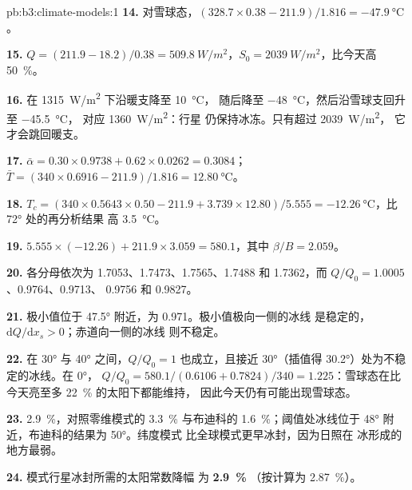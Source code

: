 \begin{solution}{pb:b3:climate-models:1}
\textbf{14.} 对雪球态，$(328.7\times0.38 - 211.9)/1.816 =
\qty{-47.9}{\celsius}$。

\textbf{15.} $Q = (211.9 - 18.2)/0.38 = \qty{509.8}{W/m^2}$，$S_0 =
\qty{2039}{W/m^2}$，比今天高 \qty{50}{\percent}。

\textbf{16.} 在 \qty{1315}{W/m^2} 下沿暖支降至 \qty{10}{\celsius}，
随后降至 \qty{-48}{\celsius}，然后沿雪球支回升至 \qty{-45.5}{\celsius}，
对应 \qty{1360}{W/m^2}：行星
仍保持冰冻。只有超过 \qty{2039}{W/m^2}，
它才会跳回暖支。

\textbf{17.} $\bar\alpha = 0.30\times0.9738 + 0.62\times0.0262 =
\num{0.3084}$；$\bar T = (340\times0.6916 - 211.9)/1.816 =
\qty{12.80}{\celsius}$。

\textbf{18.} $T_c = (340\times0.5643\times0.50 - 211.9 + 3.739\times12.80)/
5.555 = \qty{-12.26}{\celsius}$，比 \ang{72} 处的再分析结果
高 \qty{3.5}{\celsius}。

\textbf{19.} $5.555\times(-12.26) + 211.9\times3.059 = \num{580.1}$，其中
$\beta/B = \num{2.059}$。

\textbf{20.} 各分母依次为 1.7053、1.7473、1.7565、1.7488 和
1.7362，而 $Q/Q_0 = \num{1.0005}$、\num{0.9764}、\num{0.9713}、
\num{0.9756} 和 \num{0.9827}。

\textbf{21.} 极小值位于 \ang{47.5} 附近，为 \num{0.971}。极小值极向一侧的冰线
是稳定的，$\mathrm dQ/\mathrm dx_s > 0$；赤道向一侧的冰线
则不稳定。

\textbf{22.} 在 \ang{30} 与 \ang{40} 之间，$Q/Q_0 = 1$ 也成立，且接近
\ang{30}（插值得 \ang{30.2}）处为不稳定的冰线。在 \ang{0}，
$Q/Q_0 = 580.1/(0.6106 + 0.7824)/340 = \num{1.225}$：雪球态在比今天亮至多
\qty{22}{\percent} 的太阳下都能维持，
因此今天仍有可能出现雪球态。

\textbf{23.} \qty{2.9}{\percent}，对照零维模式的 \qty{3.3}{\percent}
与布迪科的 \qty{1.6}{\percent}；阈值处冰线位于
\ang{48} 附近，布迪科的结果为 \ang{50}。纬度模式
比全球模式更早冰封，因为日照在
冰形成的地方最弱。

\textbf{24.} 模式行星冰封所需的太阳常数降幅
为 \textbf{\qty[text-series-to-math=true]{2.9}{\percent}}
（按计算为 \qty{2.87}{\percent}）。
\end{solution}
